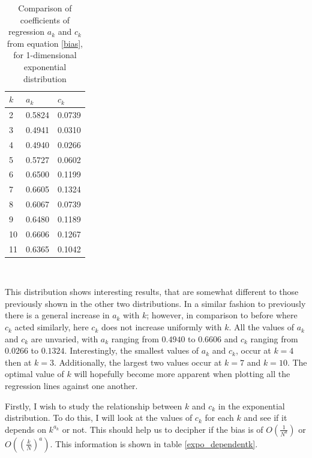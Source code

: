 \documentclass[12pt]{report}
\begin{document}
\begin{table}
\caption{Comparison of coefficients of regression $a_{k}$ and $c_{k}$ from equation \ref{bias}, for 1-dimensional exponential distribution} \label{expo_a_c_compare_table}
\begin{center}
\begin{tabular}{| l | l l |} 
\toprule
$k$ &  $a_{k}$ & $c_{k}$ \\
\midrule[1pt]
2     & 0.5824    & 0.0739   \\
3     & 0.4941    & 0.0310   \\
4     & 0.4940    & 0.0266   \\
5     & 0.5727    & 0.0602   \\
6     & 0.6500    & 0.1199   \\
7     & 0.6605    & 0.1324   \\
8     & 0.6067    & 0.0739   \\
9     & 0.6480    & 0.1189   \\
10    & 0.6606    & 0.1267   \\
11    & 0.6365    & 0.1042   \\
\hline
\end{tabular}
\\[10pt]
\end{center}
\end{table}

This distribution shows interesting results, that are somewhat different to those previously shown in the other two distributions. In a similar fashion to previously there is a general increase in $a_{k}$ with $k$; however, in comparison to before where $c_{k}$ acted similarly, here $c_{k}$ does not increase uniformly with $k$. All the values of $a_{k}$ and $c_{k}$ are unvaried, with $a_{k}$ ranging from $0.4940$ to $0.6606$ and $c_{k}$ ranging from $0.0266$ to $0.1324$. Interestingly, the smallest values of $a_{k}$ and $c_{k}$, occur at $k=4$ then at $k=3$. Additionally, the largest two values occur at $k=7$ and $k=10$. The optimal value of $k$ will hopefully become more apparent when plotting all the regression lines against one another.

Firstly, I wish to study the relationship between $k$ and $c_{k}$ in the exponential distribution. To do this, I will look at the values of $c_{k}$ for each $k$ and see if it depends on $k^{a_{k}}$ or not. This should help us to decipher if the bias is of $O \left( \frac{1}{N^{a}} \right)$ or $O\left( \left( \frac{k}{N} \right)^{a} \right)$. This information is shown in table \ref{expo_dependentk}.
\end{document}

